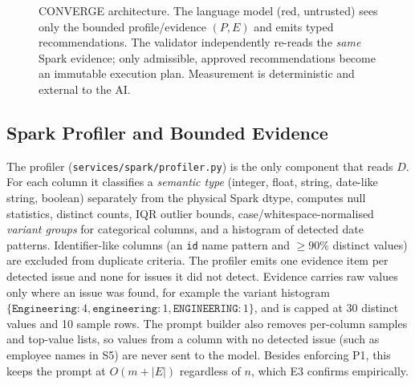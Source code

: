 \begin{figure}[t]
{}
\caption{CONVERGE architecture. The language model (red, untrusted) sees only the bounded profile/evidence $(P,E)$ and emits typed recommendations. The validator independently re-reads the \emph{same} Spark evidence; only admissible, approved recommendations become an immutable execution plan. Measurement is deterministic and external to the AI.}
\label{fig:arch}
\end{figure}

\subsection{Spark Profiler and Bounded Evidence}
The profiler (\texttt{services/spark/profiler.py}) is the only component that reads $D$. For each column it classifies a \emph{semantic type} (integer, float, string, date-like string, boolean) separately from the physical Spark dtype, computes null statistics, distinct counts, IQR outlier bounds, case/whitespace-normalised \emph{variant groups} for categorical columns, and a histogram of detected date patterns. Identifier-like columns (an \texttt{id} name pattern and $\geq90\%$ distinct values) are excluded from duplicate criteria. The profiler emits one evidence item per detected issue and none for issues it did not detect. Evidence carries raw values only where an issue was found, for example the variant histogram $\{\texttt{Engineering}{:}4,\texttt{engineering}{:}1,\texttt{ENGINEERING}{:}1\}$, and is capped at 30 distinct values and 10 sample rows. The prompt builder also removes per-column samples and top-value lists, so values from a column with no detected issue (such as employee names in S5) are never sent to the model. Besides enforcing P1, this keeps the prompt at $O(m+|E|)$ regardless of $n$, which E3 confirms empirically.

